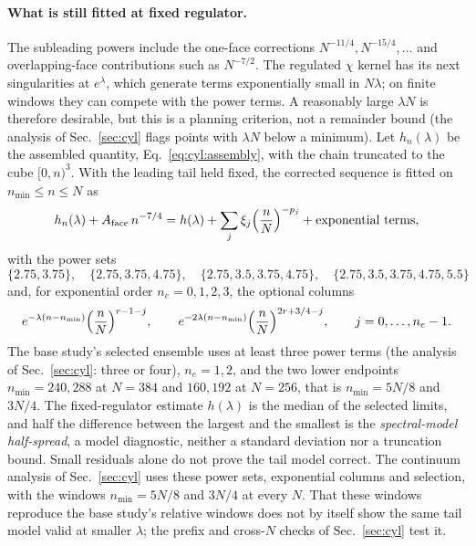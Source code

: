 \documentclass[11pt,a4paper]{article}
\numberwithin{equation}{section}
\begin{document}
\paragraph{What is still fitted at fixed regulator.} The subleading powers include the one-face corrections
$N^{-11/4},N^{-15/4},\ldots$ and overlapping-face contributions such as $N^{-7/2}$. The regulated $\chi$ kernel has its
next singularities at $e^{\lambda}$, which generate terms exponentially small in $N\lambda$; on finite windows they can
compete with the power terms. A reasonably large $\lambda N$ is therefore desirable, but this is a planning criterion,
not a remainder bound (the analysis of Sec.~\ref{sec:cyl} flags points with $\lambda N$ below a minimum). Let $h_n(\lambda)$
be the assembled quantity, Eq.~\eqref{eq:cyl:assembly}, with the chain truncated to the cube $[0,n)^3$. With the leading
tail held fixed, the corrected sequence is fitted on $n_{\min}\le n\le N$ as
\begin{equation}
 h_n(\lambda)+A_{\rm face}\,n^{-7/4}=h(\lambda)+\sum_j\xi_j\Bigl(\frac nN\Bigr)^{-p_j}+\text{exponential terms},
 \label{eq:cyl:spectralfit}
\end{equation}
with the power sets
\begin{equation}
 \{2.75,3.75\},\quad\{2.75,3.75,4.75\},\quad\{2.75,3.5,3.75,4.75\},\quad\{2.75,3.5,3.75,4.75,5.5\}
\end{equation}
and, for exponential order $n_e=0,1,2,3$, the optional columns
\begin{equation}
 e^{-\lambda(n-n_{\min})}\Bigl(\frac nN\Bigr)^{r-1-j},\qquad e^{-2\lambda(n-n_{\min})}\Bigl(\frac nN\Bigr)^{2r+3/4-j},
 \qquad j=0,\ldots,n_e-1.
\end{equation}
The base study's selected ensemble uses at least three power terms (the analysis of Sec.~\ref{sec:cyl}: three or
four), $n_e=1,2$, and the two lower endpoints $n_{\min}=240,288$ at $N=384$
and $160,192$ at $N=256$, that is $n_{\min}=5N/8$ and $3N/4$. The fixed-regulator estimate $h(\lambda)$ is the median
of the selected limits, and half the difference between the largest and the smallest is the \emph{spectral-model
half-spread}, a model diagnostic, neither a standard deviation nor a truncation bound. Small residuals alone do not
prove the tail model correct. The continuum analysis of Sec.~\ref{sec:cyl} uses these power sets, exponential columns
and selection, with the windows $n_{\min}=5N/8$ and $3N/4$ at every $N$. That these windows reproduce the base
study's relative windows does not by itself show the same tail model valid at smaller $\lambda$; the prefix and
cross-$N$ checks of Sec.~\ref{sec:cyl} test it.
\end{document}
